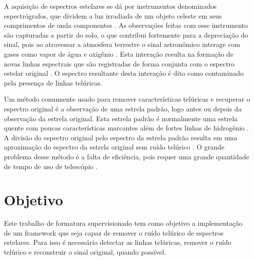 \documentclass[11pt,twoside,a4paper]{article}
\begin{document}


\par A aquisição de espectros estelares se dá por instrumentos denominados espectrógrafos, que dividem a luz irradiada de um objeto celeste em seus comprimentos de onda componentes \cite{spectrograph_aus}. As observações feitas com esse instrumento são capturadas a partir do solo, o que contribui fortemente para a depreciação do sinal, pois ao atravessar a atmosfera terrestre o sinal astronômico interage com gases como vapor de água e oxigênio \cite{seifahrt2010precise}. Esta interação resulta na formação de novas linhas espectrais que são registradas de forma conjunta com o espectro estelar original \cite{catanzaro1997high}. O espectro resultante desta interação é dito como contaminado pela presença de linhas telúricas. 

\par Um método comumente usado para remover características telúricas e recuperar o espectro original é a observação de uma estrela padrão, logo antes ou depois da observação da estrela original. Esta estrela padrão é normalmente uma estrela quente com poucas características marcantes além de fortes linhas de hidrogênio \cite{seifahrt2010precise}. A divisão do espectro original pelo espectro da estrela padrão resulta em uma aproximação do espectro da estrela original sem ruído telúrico \cite{rudolf2016modelling}. O grande problema desse método é a falta de eficiência, pois requer uma grande quantidade de tempo de uso de telescópio \cite{seifahrt2010precise}.
\section{Objetivo}
\doublespacing
Este trabalho de formatura supervisionado tem como objetivo a implementação  de um framework que seja capaz de remover o ruído telúrico de espectros estelares. Para isso é necessário detectar as linhas telúricas, remover o ruído telúrico e reconstruir o sinal original, quando possível. 
\end{document}
